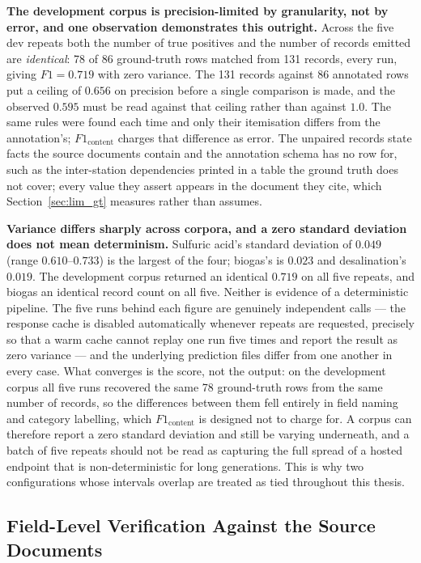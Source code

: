 \documentclass[11pt]{article}
\begin{document}
\textbf{The development corpus is precision-limited by granularity, not by
error, and one observation demonstrates this outright.} Across the five dev
repeats both the number of true positives and the number of records emitted are
\emph{identical}: 78 of 86 ground-truth rows matched from 131 records, every
run, giving $F1 = 0.719$ with zero variance. The 131 records against 86
annotated rows put a ceiling of $0.656$ on precision before a single comparison
is made, and the observed $0.595$ must be read against that ceiling rather than
against $1.0$. The same rules were found each time and only their itemisation
differs from the annotation's; $F1_{\text{content}}$ charges that difference as
error. The unpaired records state facts the source documents contain and the
annotation schema has no row for, such as the inter-station dependencies printed
in a table the ground truth does not cover; every value they assert appears in
the document they cite, which Section~\ref{sec:lim_gt} measures rather than
assumes.

\textbf{Variance differs sharply across corpora, and a zero standard deviation
does not mean determinism.} Sulfuric acid's standard deviation of $0.049$
(range $0.610$--$0.733$) is the largest of the four; biogas's is $0.023$
and desalination's $0.019$. The development corpus returned an identical $0.719$ on
all five repeats, and biogas an identical record count on all five. Neither is
evidence of a deterministic pipeline. The five runs behind each figure are
genuinely independent calls --- the response cache is disabled automatically
whenever repeats are requested, precisely so that a warm cache cannot replay one
run five times and report the result as zero variance --- and the underlying
prediction files differ from one another in every case. What converges is the
score, not the output: on the development corpus all five runs recovered the
same 78 ground-truth rows from the same number of records, so the differences
between them fell entirely in field naming and category labelling, which
$F1_{\text{content}}$ is designed not to charge for. A corpus can therefore
report a zero standard deviation and still be varying underneath, and a batch of
five repeats should not be read as capturing the full spread of a hosted
endpoint that is non-deterministic for long generations. This is why two
configurations whose intervals overlap are treated as tied throughout this
thesis.

\subsection{Field-Level Verification Against the Source Documents}
\label{sec:field_verification}
\end{document}
